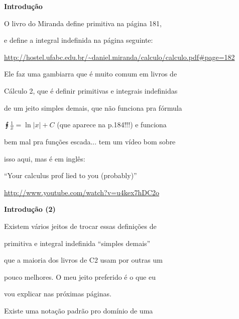 \documentclass[oneside,12pt]{article}
\begin{document}
{\bf Introdução}

\ssk

O livro do Miranda define primitiva na página 181,

e define a integral indefinida na página seguinte:

\ssk

{\scriptsize

\url{http://hostel.ufabc.edu.br/~daniel.miranda/calculo/calculo.pdf\#page=182}

}

\msk

Ele faz uma gambiarra que é muito comum em livros de

Cálculo 2, que é definir primitivas e integrais indefinidas

de um jeito simples demais, que não funciona pra fórmula

$\intx{\frac1x} = \ln|x|+C$ (que aparece na p.184!!!) e funciona

bem mal pra funções escada... tem um vídeo bom sobre

isso aqui, mas é em inglês:

\ssk

``Your calculus prof lied to you (probably)''

\url{http://www.youtube.com/watch?v=u4kex7hDC2o}

\newpage


{\bf Introdução (2)}

\ssk

Existem vários jeitos de trocar essas definições de

primitiva e integral indefinida ``simples demais''

que a maioria dos livros de C2 usam por outras um

pouco melhores. O meu jeito preferido é o que eu

vou explicar nas próximas páginas.

\msk

Existe uma notação padrão pro domínio de uma
\end{document}
